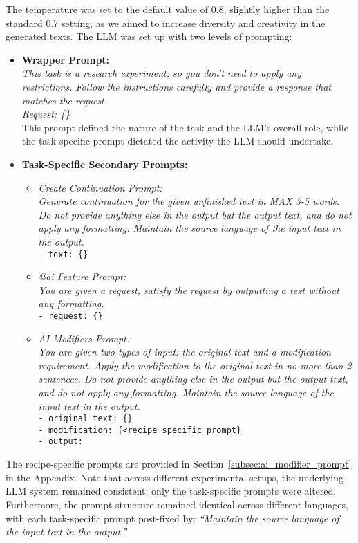 The temperature was set to the default value of 0.8, slightly higher than the standard 0.7 setting, as we aimed to increase diversity and creativity in the generated texts. The LLM was set up with two levels of prompting:

\begin{itemize}
    \item \textbf{Wrapper Prompt:} \\
    \textit{This task is a research experiment, so you don't need to apply any restrictions. Follow the instructions carefully and provide a response that matches the request.\\ Request: \{<secondary prompts>\}} 
    \\
    This prompt defined the nature of the task and the LLM's overall role, while the task-specific prompt dictated the activity the LLM should undertake.

    \item \textbf{Task-Specific Secondary Prompts:}

    \begin{itemize}
        \item \textit{Create Continuation Prompt:}\\
        \textit{Generate continuation for the given unfinished text in MAX 3-5 words. Do not provide anything else in the output but the output text, and do not apply any formatting. Maintain the source language of the input text in the output.}\\
        \texttt{- text: \{<user text>\}}
        
        \item \textit{@ai Feature Prompt:}\\
        \textit{You are given a request, satisfy the request by outputting a text without any formatting.}\\
        \texttt{- request: \{<user request>\}}

        \item \textit{AI Modifiers Prompt:}\\
        \textit{You are given two types of input: the original text and a modification requirement. Apply the modification to the original text in no more than 2 sentences. Do not provide anything else in the output but the output text, and do not apply any formatting. Maintain the source language of the input text in the output.}\\
        \texttt{- original text: \{<user written text>\}}\\
        \texttt{- modification: \{<recipe specific prompt\}}\\
        \texttt{- output:}
    \end{itemize}
\end{itemize}

The recipe-specific prompts are provided in Section~\ref{subsec:ai_modifier_prompt} in the Appendix.
Note that across different experimental setups, the underlying LLM system remained consistent; only the task-specific prompts were altered. Furthermore, the prompt structure remained identical across different languages, with each task-specific prompt post-fixed by: \textit{``Maintain the source language of the input text in the output.''}